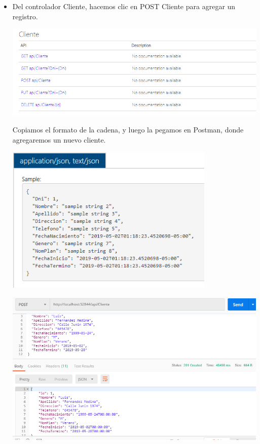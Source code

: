 \begin{itemize}
\item Del controlador Cliente, hacemos clic en POST Cliente para agregar un registro.
    \begin{center}
			\includegraphics[width=16cm]{./Imagenes/cl}
             \end{center}
Copiamos el formato de la cadena, y luego la pegamos en Postman, donde agregaremos un nuevo cliente.
    \begin{center}
			\includegraphics[width=10cm]{./Imagenes/clp}
             \end{center}
 \begin{center}
			\includegraphics[width=15cm]{./Imagenes/pcl}

\end{center}
\end{itemize}

